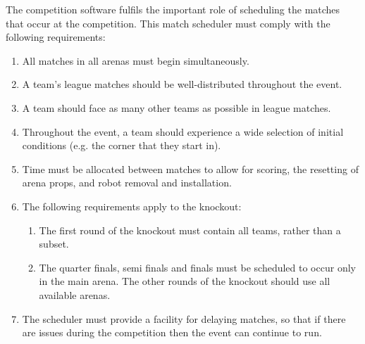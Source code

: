 The competition software fulfils the important role of scheduling the matches that occur at the competition.  This match scheduler must comply with the following requirements:
\begin{enumerate}
\item All matches in all arenas must begin simultaneously.
\item A team's league matches should be well-distributed throughout the event.
\item A team should face as many other teams as possible in league matches.
\item Throughout the event, a team should experience a wide selection of initial conditions (e.g. the corner that they start in).
\item Time must be allocated between matches to allow for scoring, the resetting of arena props, and robot removal and installation.
\item The following requirements apply to the knockout:
  \begin{enumerate}
  \item The first round of the knockout must contain all teams, rather than a subset.
  \item The quarter finals, semi finals and finals must be scheduled to occur only in the main arena.  The other rounds of the knockout should use all available arenas.
  \end{enumerate}

\item The scheduler must provide a facility for delaying matches, so that if there are issues during the competition then the event can continue to run.
\end{enumerate}

